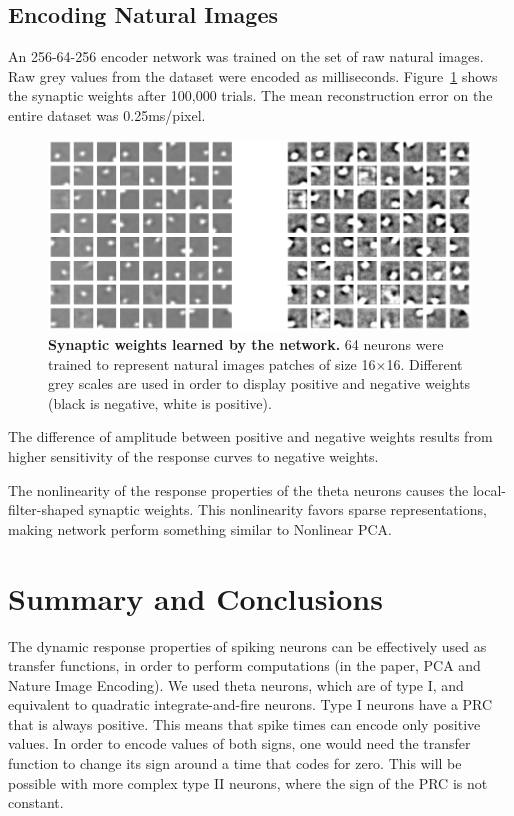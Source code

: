 \documentclass[final]{beamer}
\begin{document}
\begin{frame}[t]
\begin{multicols}{2}
\subsection{Encoding Natural Images}

An 256-64-256 encoder network was trained on the set of raw natural images. 
Raw grey values from the dataset were encoded as milliseconds.
Figure~\ref{synaptic_w} shows the synaptic weights after 100,000 trials.
The mean reconstruction error on the entire dataset was 0.25ms/pixel.

\begin{figure}
\centering
\includegraphics[width=0.8\columnwidth]{synaptic_w}
\caption{\textbf{Synaptic weights learned by the network.} 
64 neurons were trained to represent natural images patches of size 16$\times$16. 
Different grey scales are used in order to display positive and negative weights (black is negative, white is positive).}
\label{synaptic_w}
\end{figure}

The difference of amplitude between positive and negative weights results from higher sensitivity of the response curves to negative weights.

The nonlinearity of the response properties of the theta neurons causes the local-filter-shaped synaptic weights.
This nonlinearity favors sparse representations, making network perform something similar to Nonlinear PCA.




\section{Summary and Conclusions}

The dynamic response properties of spiking neurons can be effectively used as transfer functions, 
in order to perform computations (in the paper, PCA and Nature Image Encoding). 
We used theta neurons, which are of type I, and equivalent to quadratic integrate-and-fire neurons. 
Type I neurons have a PRC that is always positive. This means that spike times can encode only
positive values. In order to encode values of both signs, one would need the transfer function to change its sign around a time that codes for zero. This will be possible with more complex type II neurons, where the sign of the PRC is not constant.



\end{multicols}
\end{frame}
\end{document}

